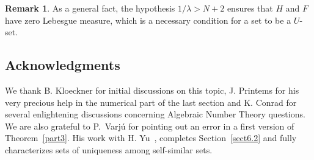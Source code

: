 \documentclass[10pt]{amsart}
\theoremstyle{definition}\newtheorem{defi}[theo]{Definition}\newtheorem{rema}[theo]{Remark}\newtheorem{exam}[theo]{Example}\newtheorem{exem}[theo]{Example}\newtheorem{nota}[theo]{Notation}
\begin{document}
\begin{rema}
As a general fact, the hypothesis $1/\lambda>N+2$ ensures that $H$ and $F$ have zero Lebesgue measure, which is a necessary condition for a set to be a $U$-set.
\end{rema}



\subsection*{Acknowledgments}
We thank B. Kloeckner for initial discussions on this topic, J. Printems for his very precious help in the numerical part of the last section and K. Conrad for several enlightening discussions concerning Algebraic Number Theory questions. We are also grateful to P.~Varjú for pointing out an error in a first version of Theorem~\ref{part3}. His work with H. Yu~\cite{varjuhu}, completes Section~\ref{sect6.2} and fully characterizes sets of uniqueness among self-similar sets.
\end{document}
